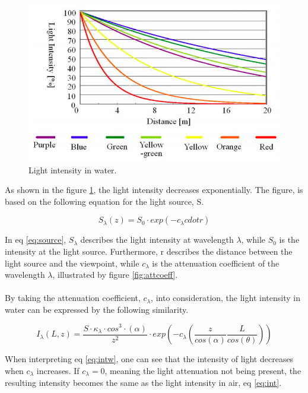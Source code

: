 \begin{figure}[H]
\centering
  \includegraphics[width=\linewidth]{Images/theory/intensity.png}
  \caption{Light intensity in water.}
  \label{fig:lightinwater}
\end{figure}

As shown in the figure \ref{fig:lightinwater}, the light intensity decreases exponentially. The figure, is based on the following equation for the light source, S. 

\begin{equation} \label{eq:source}
S_{\lambda} (z) = S_0 \cdot exp (-c_{\lambda} cdot r)
\end{equation}

In eq \ref{eq:source}, $S_{\lambda}$ describes the light intensity at wavelength $\lambda$, while $S_0$ is the intensity at the light source. Furthermore, r describes the distance between the light source and the viewpoint, while $c_{\lambda}$ is the attenuation coefficient of the wavelength $\lambda$, illustrated by figure \ref{fig:attcoeff}.
\\\\
By taking the attenuation coefficient, $c_{\lambda}$, into consideration, the light intensity in water can be expressed by the following similarity. 

\begin{equation} \label{eq:intw}
    I_ {\lambda} (L, z) = \frac{S \cdot \kappa_{\lambda}\cdot cos^{3}\cdot (\alpha)}{z^2} \cdot exp \left(-c_{\lambda}\left(\frac{z}{cos(\alpha)}\frac{L}{cos(\theta)}\right)\right)
\end{equation}

When interpreting eq \ref{eq:intw}, one can see that the intensity of light decreases when $c_{\lambda}$ increases. If $c_{\lambda} = 0$, meaning the light attenuation not being present, the resulting intensity becomes the same as the light intensity in air, eq \ref{eq:int}. 

